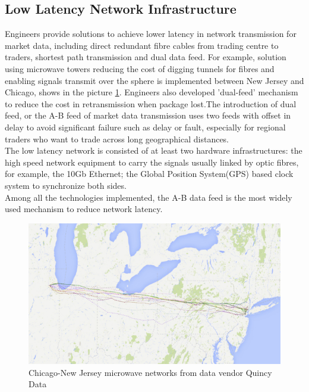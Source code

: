 \documentclass[11pt,openright,a4paper]{report}
\begin{document}
\subsection{Low Latency Network Infrastructure}
Engineers provide solutions to achieve lower latency in network transmission for market data, including direct redundant fibre cables from trading centre to traders, shortest path transmission and dual data feed. For example, solution using microwave towers reducing the cost of digging tunnels for fibres and enabling signals transmit over the sphere is implemented between New Jersey and Chicago\cite{htfbackyard}, shows in the picture \ref{fig:2}. Engineers also developed 'dual-feed' mechanism to reduce the cost in retransmission when package lost\cite{zusman1999fault}.The introduction of dual feed, or the A-B feed of market data transmission uses two feeds with offset in delay to avoid significant failure such as delay or fault, especially for regional traders who want to trade across long geographical distances. \\
The low latency network is consisted of at least two hardware infrastructures: the high speed network equipment to carry the signals usually linked by optic fibres, for example, the 10Gb Ethernet; the Global Position System(GPS) based clock system to synchronize both sides\cite{brook2015low}.\\
Among all the technologies implemented, the A-B data feed is the most widely used mechanism to reduce network latency.\\
\begin{figure}[H]
	\centering\includegraphics[width=0.7\linewidth]{picture/newyork-chicago.jpg}
	\caption{Chicago-New Jersey microwave networks from data vendor Quincy Data}
	\label{fig:2}
\end{figure}
\end{document}
